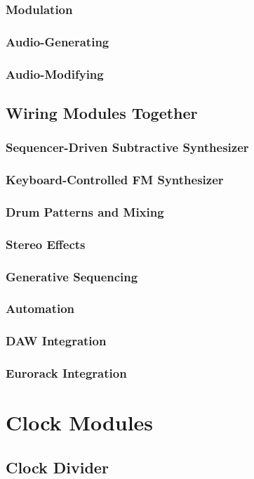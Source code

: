 \documentclass[11pt]{book}
\begin{document}
\subsection{Modulation}
\subsection{Audio-Generating}
\subsection{Audio-Modifying}


\section{Wiring Modules Together}
\subsection{Sequencer-Driven Subtractive Synthesizer}
\subsection{Keyboard-Controlled FM Synthesizer}
\subsection{Drum Patterns and Mixing}
\subsection{Stereo Effects}
\subsection{Generative Sequencing}
\subsection{Automation}
\subsection{DAW Integration}
\subsection{Eurorack Integration}


\chapter{Clock Modules}
\section{Clock Divider}
\end{document}
